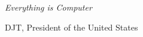 
\thispagestyle{empty}

\vspace*{\fill}
\epigraph{\textit{Everything is Computer}}{DJT, President of the United States}
\vspace*{\fill}

\thispagestyle{empty}
\newpage
